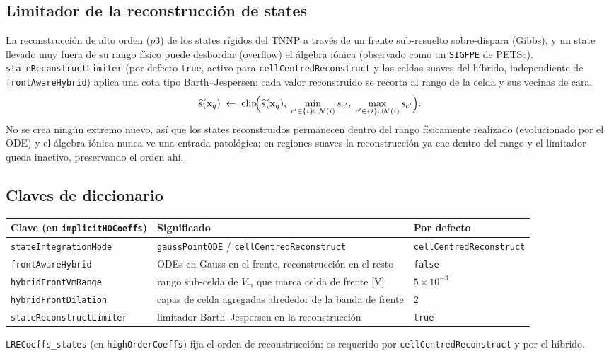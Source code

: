\documentclass[11pt,a4paper]{article}
\newcommand{\code}[1]{\texttt{\small #1}}
\newcommand{\Vm}{V_{\text{m}}}
\newcommand{\dictkey}[1]{\textcolor{black!60!green}{\texttt{\footnotesize #1}}}
\begin{document}
\subsection{Limitador de la reconstrucción de states}
\label{sec:limiter}

La reconstrucción de alto orden ($p3$) de los states rígidos del TNNP a través de
un frente sub-resuelto sobre-dispara (Gibbs), y un state llevado muy fuera de su
rango físico puede desbordar (overflow) el álgebra iónica (observado como un
\code{SIGFPE} de PETSc). \dictkey{stateReconstructLimiter} (por defecto
\code{true}, activo para \code{cellCentredReconstruct} y las celdas suaves del
híbrido, independiente de \dictkey{frontAwareHybrid}) aplica una cota tipo
Barth--Jespersen: cada valor reconstruido se recorta al rango de la celda y sus
vecinas de cara,
\begin{equation}
  \widehat{s}(\mathbf{x}_q)
  \;\leftarrow\;
  \mathrm{clip}\!\Bigl(\widehat{s}(\mathbf{x}_q),\;
     \min_{c'\in\{i\}\cup\mathcal{N}(i)} s_{c'},\;
     \max_{c'\in\{i\}\cup\mathcal{N}(i)} s_{c'}\Bigr).
  \label{eq:limiter}
\end{equation}
No se crea ningún extremo nuevo, así que los states reconstruidos permanecen dentro
del rango físicamente realizado (evolucionado por el ODE) y el álgebra iónica nunca
ve una entrada patológica; en regiones suaves la reconstrucción ya cae dentro del
rango y el limitador queda inactivo, preservando el orden ahí.

\subsection{Claves de diccionario}

\begin{center}
\begin{tabular}{@{}lll@{}}
\toprule
Clave (en \code{implicitHOCoeffs}) & Significado & Por defecto \\
\midrule
\code{stateIntegrationMode} & \code{gaussPointODE} / \code{cellCentredReconstruct} & \code{cellCentredReconstruct} \\
\code{frontAwareHybrid} & ODEs en Gauss en el frente, reconstrucción en el resto & \code{false} \\
\code{hybridFrontVmRange} & rango sub-celda de $\Vm$ que marca celda de frente [V] & $5\times10^{-3}$ \\
\code{hybridFrontDilation} & capas de celda agregadas alrededor de la banda de frente & $2$ \\
\code{stateReconstructLimiter} & limitador Barth--Jespersen en la reconstrucción & \code{true} \\
\bottomrule
\end{tabular}
\end{center}
\code{LRECoeffs\_states} (en \code{highOrderCoeffs}) fija el orden de
reconstrucción; es requerido por \code{cellCentredReconstruct} y por el híbrido.
\end{document}
